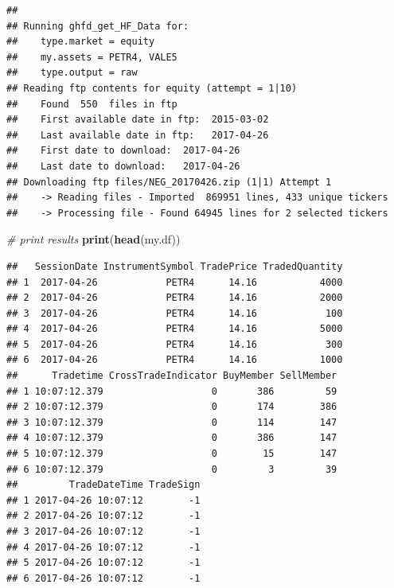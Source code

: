 \documentclass[11pt,]{book}
\newenvironment{Shaded}{\begin{snugshade}}{\end{snugshade}}
\newcommand{\KeywordTok}[1]{\textcolor[rgb]{0.27,0.27,0.27}{\textbf{#1}}}
\newcommand{\DataTypeTok}[1]{\textcolor[rgb]{0.27,0.27,0.27}{#1}}
\newcommand{\StringTok}[1]{\textcolor[rgb]{0.5,0.5,0.5}{#1}}
\newcommand{\CommentTok}[1]{\textcolor[rgb]{0.56,0.35,0.01}{\textit{#1}}}
\newcommand{\OperatorTok}[1]{\textcolor[rgb]{0.81,0.36,0.00}{\textbf{#1}}}
\newcommand{\NormalTok}[1]{#1}
\begin{document}
\begin{Shaded}
\end{Shaded}

\begin{verbatim}
## 
## Running ghfd_get_HF_Data for:
##    type.market = equity
##    my.assets = PETR4, VALE5
##    type.output = raw
## Reading ftp contents for equity (attempt = 1|10)
##    Found  550  files in ftp
##    First available date in ftp:  2015-03-02
##    Last available date in ftp:   2017-04-26
##    First date to download:  2017-04-26
##    Last date to download:   2017-04-26
## Downloading ftp files/NEG_20170426.zip (1|1) Attempt 1
##    -> Reading files - Imported  869951 lines, 433 unique tickers
##    -> Processing file - Found 64945 lines for 2 selected tickers
\end{verbatim}

\begin{Shaded}
\begin{Highlighting}[]
\CommentTok{# print results}
\KeywordTok{print}\NormalTok{(}\KeywordTok{head}\NormalTok{(my.df))}
\end{Highlighting}
\end{Shaded}

\begin{verbatim}
##   SessionDate InstrumentSymbol TradePrice TradedQuantity
## 1  2017-04-26            PETR4      14.16           4000
## 2  2017-04-26            PETR4      14.16           2000
## 3  2017-04-26            PETR4      14.16            100
## 4  2017-04-26            PETR4      14.16           5000
## 5  2017-04-26            PETR4      14.16            300
## 6  2017-04-26            PETR4      14.16           1000
##      Tradetime CrossTradeIndicator BuyMember SellMember
## 1 10:07:12.379                   0       386         59
## 2 10:07:12.379                   0       174        386
## 3 10:07:12.379                   0       114        147
## 4 10:07:12.379                   0       386        147
## 5 10:07:12.379                   0        15        147
## 6 10:07:12.379                   0         3         39
##         TradeDateTime TradeSign
## 1 2017-04-26 10:07:12        -1
## 2 2017-04-26 10:07:12        -1
## 3 2017-04-26 10:07:12        -1
## 4 2017-04-26 10:07:12        -1
## 5 2017-04-26 10:07:12        -1
## 6 2017-04-26 10:07:12        -1
\end{verbatim}
\end{document}
